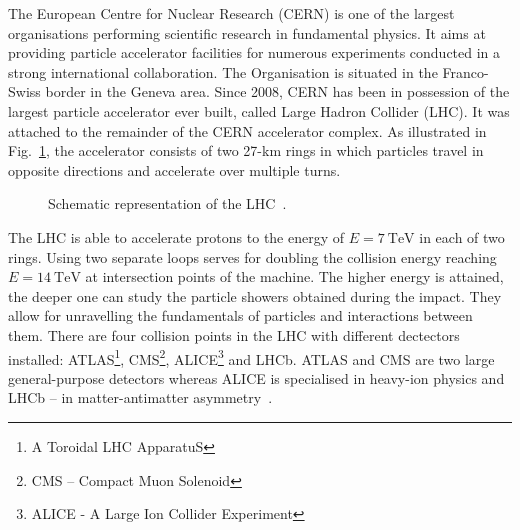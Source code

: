
The European Centre for Nuclear Research (CERN) is one of the largest organisations performing scientific research in fundamental physics. It aims at providing particle accelerator facilities for numerous experiments conducted in a strong international collaboration. The Organisation is situated in the Franco-Swiss border in the Geneva area. Since 2008, CERN has been in possession of the largest particle accelerator ever built, called Large Hadron Collider (LHC). It was attached to the remainder of the CERN accelerator complex. As illustrated in Fig.~\ref{fig:schematic_representation_lhc}, the  accelerator consists of two 27-km rings in which particles travel in opposite directions and accelerate over multiple turns. 

\begin{figure}[H]
    \centering
    \caption{Schematic representation of the LHC~\cite{schematic_representation_lhc}.}
    \label{fig:schematic_representation_lhc}
\end{figure}

The LHC is able to accelerate protons to the energy of $E=7~\text{TeV}$ in each of two rings.  Using two separate loops serves for doubling the collision energy reaching $E=14~\text{TeV}$ at intersection points of the machine. The higher energy is attained, the deeper one can study the particle showers obtained during the impact. They allow for unravelling the fundamentals of particles and interactions between them. There are four collision points in the LHC with different dectectors installed: ATLAS\footnote{A Toroidal LHC ApparatuS}, CMS\footnote{CMS -- Compact Muon Solenoid}, ALICE\footnote{ALICE - A Large Ion Collider Experiment} and LHCb. ATLAS and CMS are two large general-purpose detectors whereas ALICE is specialised in heavy-ion physics and LHCb -- in matter-antimatter asymmetry~\cite[p.~3-21]{evans_marvel_of_technology}.


